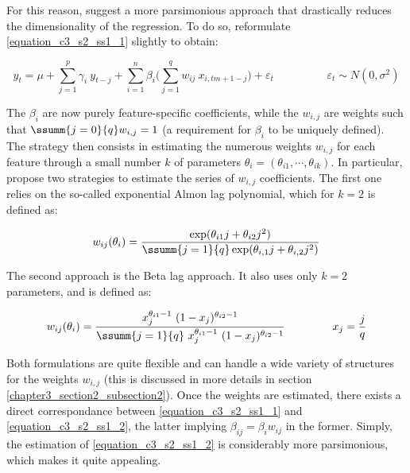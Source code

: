 \newpage

For this reason, \cite{Ghysels2007} suggest a more parsimonious approach that drastically reduces the dimensionality of the regression. To do so, reformulate \ref{equation_c3_s2_ss1_1} slightly to obtain:

\begin{equation}
y_t = \mu + \sum_{j=1}^{p} \gamma_i \ y_{t-j} + \sum_{i=1}^{n} \beta_i \big( \sum_{j=1}^{q}  w_{ij} \  x_{i,tm+1-j} \big) + \varepsilon_t \hspace{2cm}
\varepsilon_t \sim N(0, \sigma^2)
\label{equation_c3_s2_ss1_2}
\end{equation}

The $\beta_i$ are now purely feature-specific coefficients, while the $w_{i,j}$ are weights such that $\ssumm{j=0}{q} w_{i,j} = 1$ (a requirement for $\beta_i$ to be uniquely defined). The strategy then consists in estimating the numerous weights $w_{i,j}$ for each feature through a small number $k$ of parameters $\theta_i = ( \theta_{i1}, \cdots, \theta_{ik})$. In particular, \cite{Ghysels2007} propose two strategies to estimate the series of $w_{i,j}$ coefficients. The first one relies on the so-called exponential Almon lag polynomial, which for $k=2$ is defined as:

\begin{equation}
w_{ij}(\theta_i) = \frac{\exp(\theta_{i1} j + \theta_{i2} j^2)}{\ssumm{j=1}{q} \exp(\theta_{i,1} j + \theta_{i,2} j^2)}
\label{equation_c3_s2_ss1_3}
\end{equation}

The second approach is the Beta lag approach. It also uses only $k=2$ parameters, and is defined as:

\begin{equation}
w_{ij}(\theta_i) = \frac{x_j^{\theta_{i1}-1} \ (1-x_j)^{\theta_{i2}-1}}{\ssumm{j=1}{q} \ x_j^{\theta_{i1}-1} \ (1-x_j)^{\theta_{i2}-1}} 
\hspace{15mm}
x_j = \frac{j}{q}
\label{equation_c3_s2_ss1_4}
\end{equation}

Both formulations are quite flexible and can handle a wide variety of structures for the weights $w_{i,j}$ (this is discussed in more details in section \ref{chapter3_section2_subsection2}). Once the weights are estimated, there exists a direct correspondance between \ref{equation_c3_s2_ss1_1} and \ref{equation_c3_s2_ss1_2}, the latter implying $\beta_{ij} = \beta_{i} w_{ij}$ in the former. Simply, the estimation of \ref{equation_c3_s2_ss1_2} is considerably more parsimonious, which makes it quite appealing. 




